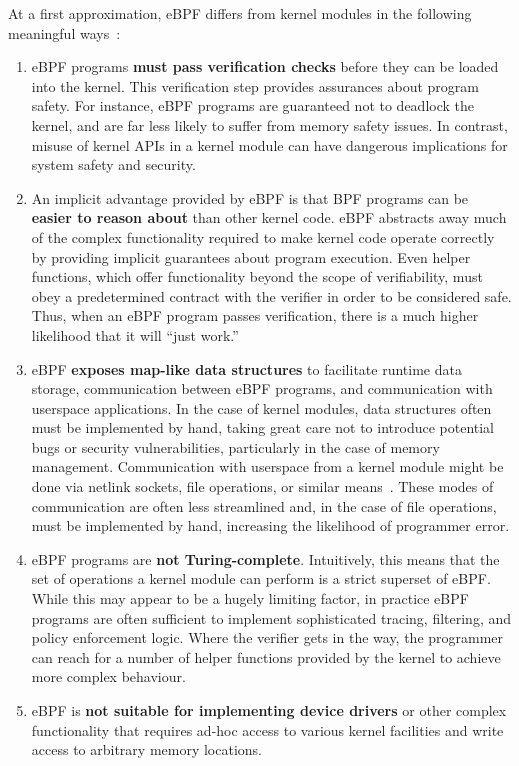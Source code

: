 At a first approximation, eBPF differs from kernel modules in the following meaningful ways~\cite{gregg2019_bpf}:
\begin{enumerate}
  \item eBPF programs \textbf{must pass verification checks} before they can be loaded into the
  kernel. This verification step provides assurances about program safety. For instance, eBPF
  programs are guaranteed not to deadlock the kernel, and are far less likely to suffer from
  memory safety issues. In contrast, misuse of kernel APIs in a kernel module can have dangerous
  implications for system safety and security.

  \item An implicit advantage provided by eBPF is that BPF programs can be \textbf{easier
  to reason about} than other kernel code. eBPF abstracts away much of the complex
  functionality required to make kernel code operate correctly by providing implicit
  guarantees about program execution. Even helper functions, which offer functionality
  beyond the scope of verifiability, must obey a predetermined contract with the verifier
  in order to be considered safe. Thus, when an eBPF program passes verification, there is
  a much higher likelihood that it will \enquote{just work.}

  \item eBPF \textbf{exposes map-like data structures} to facilitate runtime data storage,
  communication between eBPF programs, and communication with userspace applications. In
  the case of kernel modules, data structures often must be implemented by hand, taking
  great care not to introduce potential bugs or security vulnerabilities, particularly in
  the case of memory management. Communication with userspace from a kernel module might
  be done via netlink sockets, file operations, or similar
  means~\cite{corbet1998_device_drivers}. These modes of communication are often less
  streamlined and, in the case of file operations, must be implemented by hand, increasing
  the likelihood of programmer error.

  \item eBPF programs are \textbf{not Turing-complete}. Intuitively, this means that
  the set of operations a kernel module can perform is a strict superset of eBPF. While
  this may appear to be a hugely limiting factor, in practice eBPF programs are often
  sufficient to implement sophisticated tracing, filtering, and policy enforcement logic.
  Where the verifier gets in the way, the programmer can reach for a number of helper
  functions provided by the kernel to achieve more complex behaviour.

  \item eBPF is \textbf{not suitable for implementing device drivers} or other complex
  functionality that requires ad-hoc access to various kernel facilities and write access
  to arbitrary memory locations.
\end{enumerate}

